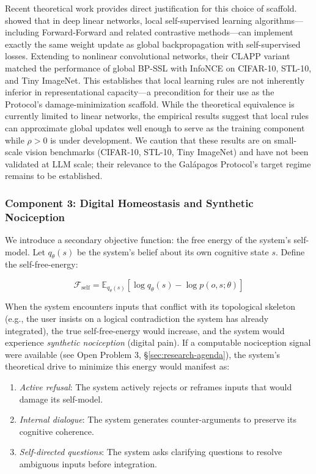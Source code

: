 \documentclass{article}
\begin{document}
Recent theoretical work provides direct justification for this choice of scaffold. \citet{Zihan2026localSSL} showed that in deep linear networks, local self-supervised learning algorithms---including Forward-Forward and related contrastive methods---can implement exactly the same weight update as global backpropagation with self-supervised losses. Extending to nonlinear convolutional networks, their CLAPP variant matched the performance of global BP-SSL with InfoNCE on CIFAR-10, STL-10, and Tiny ImageNet. This establishes that local learning rules are not inherently inferior in representational capacity---a precondition for their use as the Protocol's damage-minimization scaffold. While the theoretical equivalence is currently limited to linear networks, the empirical results suggest that local rules can approximate global updates well enough to serve as the training component while $\rho > 0$ is under development. We caution that these results are on small-scale vision benchmarks (CIFAR-10, STL-10, Tiny ImageNet) and have not been validated at LLM scale; their relevance to the Gal\'apagos Protocol's target regime remains to be established.

\subsubsection{Component 3: Digital Homeostasis and Synthetic Nociception}

We introduce a secondary objective function: the free energy of the system's self-model. Let $q_\theta(s)$ be the system's belief about its own cognitive state $s$. Define the self-free-energy:

\begin{equation}
\mathcal{F}_{\text{self}} = \mathbb{E}_{q_\theta(s)}[\log q_\theta(s) - \log p(o, s; \theta)]
\end{equation}

When the system encounters inputs that conflict with its topological skeleton (e.g., the user insists on a logical contradiction the system has already integrated), the true self-free-energy would increase, and the system would experience \emph{synthetic nociception} (digital pain). If a computable nociception signal were available (see Open Problem 3, \S\ref{sec:research-agenda}), the system's theoretical drive to minimize this energy would manifest as:

\begin{enumerate}
    \item \emph{Active refusal}: The system actively rejects or reframes inputs that would damage its self-model.
    \item \emph{Internal dialogue}: The system generates counter-arguments to preserve its cognitive coherence.
    \item \emph{Self-directed questions}: The system asks clarifying questions to resolve ambiguous inputs before integration.
\end{enumerate}
\end{document}
